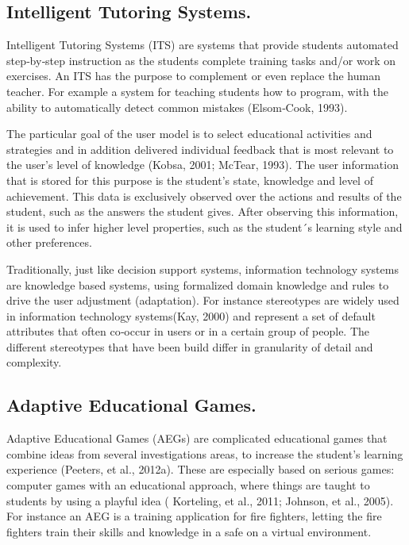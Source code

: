 \subsection{Intelligent Tutoring Systems.}

Intelligent Tutoring Systems (ITS) are systems that provide students automated
step‐by‐step instruction as the students complete training tasks and/or work on
exercises. An ITS has the purpose to complement or even replace the human
teacher. For example a system for teaching students how to program, with the
ability to automatically detect common mistakes (Elsom‐Cook, 1993).

The particular goal of the user model is to select educational activities and
strategies and in addition  delivered individual feedback that is most relevant
to the user’s level of knowledge (Kobsa, 2001;  McTear, 1993). The user
information that is stored for this purpose is the student’s state, knowledge
and level of  achievement. This data is exclusively observed over the actions
and results of the student, such as the answers the student gives. After
observing this information, it is used to infer higher level  properties, such
as the student´s learning style and other preferences.

Traditionally, just like decision support systems, information technology
systems are knowledge based systems, using formalized domain  knowledge and
rules to drive the user adjustment (adaptation). For instance stereotypes are
widely used in information technology systems(Kay, 2000)  and represent a set of
default attributes that often co‐occur in users or in a certain group of people.
The different stereotypes that have been build differ in granularity of detail
and complexity.


\subsection{Adaptive Educational Games.} 

Adaptive Educational Games (AEGs) are complicated educational games that combine
ideas from several investigations areas, to increase the student’s learning
experience (Peeters, et al., 2012a). These are especially based on  serious
games: computer games with an educational approach, where things are taught to
students by using a  playful idea ( Korteling, et al., 2011; Johnson, et al.,
2005). For instance an AEG is a training application  for fire fighters, letting
the fire fighters train their skills and knowledge in a safe on a virtual
environment.
  
